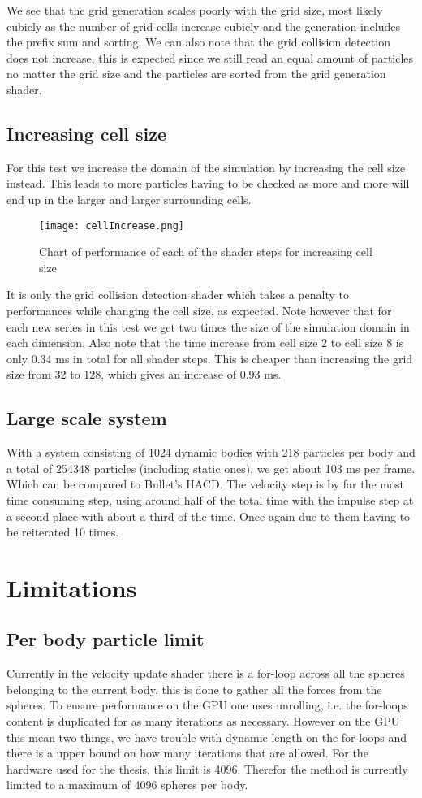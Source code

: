 We see that the grid generation scales poorly with the grid size, most likely cubicly
as the number of grid cells increase cubicly and the generation includes the prefix sum and sorting.
We can also note that the grid collision detection does not increase, this is expected since
we still read an equal amount of particles no matter the grid size and the particles are
sorted from the grid generation shader.

\subsection{Increasing cell size}
For this test we increase the domain of the simulation by increasing the cell size instead.
This leads to more particles having to be checked as more and more will end up in
the larger and larger surrounding cells.
\begin{figure}[H]
  \centering
  \texttt{[image: cellIncrease.png]}
  \caption{Chart of performance of each of the shader steps for increasing cell size}
\end{figure}

It is only the grid collision detection shader which takes a penalty to performances
while changing the cell size, as expected. Note however that for each new series
in this test we get two times the size of the simulation domain in each dimension.
Also note that the time increase from cell size 2 to cell size 8 is only 0.34 ms in total for all shader steps.
This is cheaper than increasing the grid size from 32 to 128, which gives an increase of 0.93 ms.

\subsection{Large scale system}
With a system consisting of 1024 dynamic bodies with 218 particles per body
 and a total of 254348 particles (including
static ones), we get about 103 ms per frame. Which can be compared to Bullet's HACD.
The velocity step is by far the most time consuming step, using around half of the total time with
the impulse step at a second place with about a third of the time. Once again due
to them having to be reiterated 10 times.

\section{Limitations}
\subsection{Per body particle limit}
Currently in the velocity update shader there is a for-loop across all the spheres
belonging to the current body, this is done to gather all the forces from the spheres.
To ensure performance on the GPU one uses unrolling, i.e. the for-loops content is
duplicated for as many iterations as necessary. However on the GPU this mean two
things, we have trouble with dynamic length on the for-loops and there is a upper
bound on how many iterations that are allowed. For the hardware used for the thesis,
this limit is 4096. Therefor the method is currently limited to a maximum of 4096
spheres per body.

